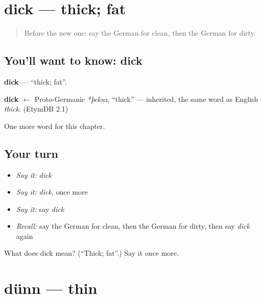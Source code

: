 \section[dick]{dick — thick; fat}

\label{lesson:GE-C92-dick}



\begin{quote}
Before the new one: say the German for clean, then the German for dirty.
\end{quote}

\subsection*{You'll want to know: dick}
\textbf{dick} — \textquotedblleft{}thick; fat\textquotedblright{}.

\begin{cousinweb}
\textbf{dick} $\leftarrow$ Proto-Germanic \emph{*þekuz}, \textquotedblleft{}thick\textquotedblright{} — inherited, the same word as English \emph{thick}. (EtymDB 2.1)
\end{cousinweb}

\begin{grammarlens}[title={What you've built}]
One more word for this chapter.
\end{grammarlens}

\subsection*{Your turn}
\begin{itemize}
\raggedright
  \item \emph{Say it:} \emph{dick}
  \item \emph{Say it:} \emph{dick}, once more
  \item \emph{Say it:} say \emph{dick}
  \item \emph{Recall:} say the German for clean, then the German for dirty, then say \emph{dick} again
\end{itemize}

\begin{tcolorbox}[breakable,colback=teal!4,colframe=teal!35!black,title={Before you move on}]
What does dick mean? (\textquotedblleft{}Thick; fat\textquotedblright{}.) Say it once more.
\end{tcolorbox}
\section[dünn]{dünn — thin}

